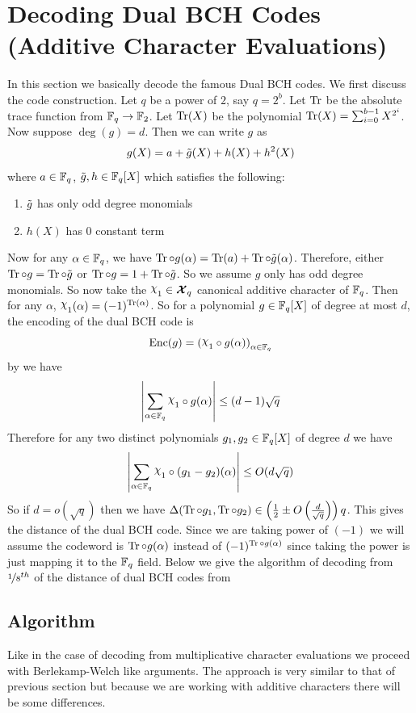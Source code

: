 \section{Decoding Dual BCH Codes (Additive Character Evaluations)}
In this section we basically decode the famous Dual BCH codes. We first discuss the code construction. Let $q$ be a power of $2$, say $q=2^b$. Let $\operatorname{Tr}$ be the absolute trace function from $\mathbb{F}_q\to \mathbb{F}_2$. Let $\operatorname{Tr}(X)$ be the polynomial $\operatorname{Tr}(X)=\sum_{i=0}^{b-1}X^{2^i}$. Now suppose $\deg(g)=d$. Then we can write $g$ as $$g(X)=a+\tilde{g}(X)+h(X)+h^2(X)$$where $a\in\mathbb{F}_q$, $\tilde{g},h\in\mathbb{F}_q[X]$ which satisfies the following:\begin{enumerate}[label=(\roman*)]
  \item $\tilde{g}$ has only odd degree monomials
  \item $h(X)$ has $0$ constant term
\end{enumerate}
Now for any $\alpha\in\mathbb{F}_q$, we have $\operatorname{Tr}\circ g(\alpha)=\operatorname{Tr}(a)+\operatorname{Tr}\circ \tilde{g}(\alpha)$. Therefore, either $\operatorname{Tr}\circ g=\operatorname{Tr}\circ \tilde{g}$ or $\operatorname{Tr}\circ g=1+\operatorname{Tr}\circ \tilde{g}$. So we assume $g$ only has odd degree monomials. So now take the $\chi_1\in\Xq$ canonical additive character of $\mathbb{F}_q$. Then for any $\alpha$, $\chi_1(\alpha)=(-1)^{\tr(\alpha)}$. So for a polynomial $g\in\mathbb{F}_q[X]$ of degree at most $d$, the encoding of the dual BCH code is $$\enc(g)=\lt(\chi_1\circ g(\alpha)\rt)_{\alpha\in\bbF_q}$$ by \WeilBoundChithm we have $$\lt|\sum_{\alpha\in\bbF_q}\chi_1\circ g(\alpha)\rt|\leq (d-1)\sqrt{q}$$Therefore for any two distinct polynomials $g_1,g_2\in\mathbb{F}_q[X]$ of degree $d$ we have $$\lt|\sum_{\alpha\in\bbF_q}\chi_1\circ (g_1-g_2)(\alpha)\rt|\leq O(d\sqrt{q})$$So if $d=o(\sqrt{q})$ then we have $\Delta(\operatorname{Tr}\circ g_1,\operatorname{Tr}\circ g_2)\in\left(\frac12\pm O\left(\frac{d}{\sqrt{q}}\right)\right)q$. This gives the distance of the dual BCH code. Since we are taking power of $(-1)$ we will assume the codeword is $\operatorname{Tr}\circ g(\alpha)$ instead of $(-1)^{\operatorname{Tr}\circ g(\alpha)}$  since taking the power is just mapping it to the $\mathbb{F}_q$ field. Below we give the algorithm of decoding from $\nicefrac18^{th}$ of the distance of dual BCH codes from \cite{Kopparty2026}

\subsection{Algorithm}
Like in the case of decoding from multiplicative character evaluations we proceed with Berlekamp-Welch like arguments. The approach is very similar to that of previous section but because we are working with additive characters there will be some differences.

